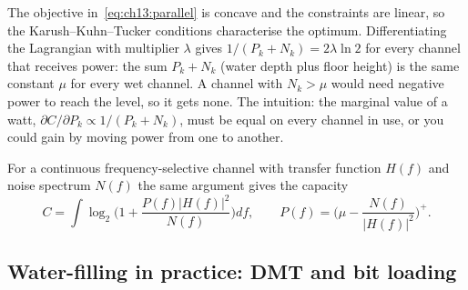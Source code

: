 
\begin{deeper}
The objective in~\eqref{eq:ch13:parallel} is concave and the constraints are linear, so the
Karush--Kuhn--Tucker conditions characterise the optimum. Differentiating the Lagrangian with
multiplier $\lambda$ gives $1/(P_k+N_k)=2\lambda\ln 2$ for every channel that receives power: the
sum $P_k+N_k$ (water depth plus floor height) is the same constant $\mu$ for every wet channel.
A channel with $N_k>\mu$ would need negative power to reach the level, so it gets none. The
intuition: the marginal value of a watt, $\partial C/\partial P_k\propto1/(P_k+N_k)$, must be equal
on every channel in use, or you could gain by moving power from one to another.
\end{deeper}

For a continuous frequency-selective channel with transfer function $H(f)$ and noise spectrum
$N(f)$ the same argument gives the capacity
\begin{equation}
C=\int\log_2\!\Big(1+\frac{P(f)|H(f)|^2}{N(f)}\Big)df,\qquad
P(f)=\Big(\mu-\frac{N(f)}{|H(f)|^2}\Big)^+.
\label{eq:ch13:wfcont}
\end{equation}

\subsection{Water-filling in practice: DMT and bit loading}

